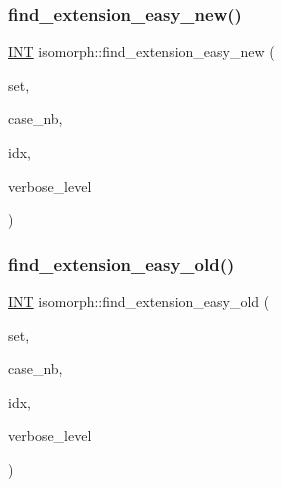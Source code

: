 \subsubsection{\texorpdfstring{find\+\_\+extension\+\_\+easy\+\_\+new()}{find\_extension\_easy\_new()}}
{\footnotesize\ttfamily \mbox{\hyperlink{galois_8h_a09fddde158a3a20bd2dcadb609de11dc}{I\+NT}} isomorph\+::find\+\_\+extension\+\_\+easy\+\_\+new (\begin{DoxyParamCaption}\item[{\mbox{\hyperlink{galois_8h_a09fddde158a3a20bd2dcadb609de11dc}{I\+NT}} $\ast$}]{set,  }\item[{\mbox{\hyperlink{galois_8h_a09fddde158a3a20bd2dcadb609de11dc}{I\+NT}}}]{case\+\_\+nb,  }\item[{\mbox{\hyperlink{galois_8h_a09fddde158a3a20bd2dcadb609de11dc}{I\+NT}} \&}]{idx,  }\item[{\mbox{\hyperlink{galois_8h_a09fddde158a3a20bd2dcadb609de11dc}{I\+NT}}}]{verbose\+\_\+level }\end{DoxyParamCaption})}

\mbox{\label{classisomorph_ac527cea5328b515e3194c998217ea0bf}} 
\subsubsection{\texorpdfstring{find\+\_\+extension\+\_\+easy\+\_\+old()}{find\_extension\_easy\_old()}}
{\footnotesize\ttfamily \mbox{\hyperlink{galois_8h_a09fddde158a3a20bd2dcadb609de11dc}{I\+NT}} isomorph\+::find\+\_\+extension\+\_\+easy\+\_\+old (\begin{DoxyParamCaption}\item[{\mbox{\hyperlink{galois_8h_a09fddde158a3a20bd2dcadb609de11dc}{I\+NT}} $\ast$}]{set,  }\item[{\mbox{\hyperlink{galois_8h_a09fddde158a3a20bd2dcadb609de11dc}{I\+NT}}}]{case\+\_\+nb,  }\item[{\mbox{\hyperlink{galois_8h_a09fddde158a3a20bd2dcadb609de11dc}{I\+NT}} \&}]{idx,  }\item[{\mbox{\hyperlink{galois_8h_a09fddde158a3a20bd2dcadb609de11dc}{I\+NT}}}]{verbose\+\_\+level }\end{DoxyParamCaption})}

\mbox{\label{classisomorph_af2d3de77d6df176083f2af2e1108ccb4}} 
